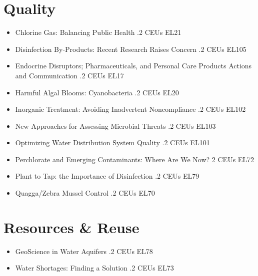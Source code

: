 \documentclass[10pt]{article}
\begin{document}
\section{Quality}
\begin{itemize}
  \item Chlorine Gas: Balancing Public Health .2 CEUs EL21

  \item Disinfection By-Products: Recent Research Raises Concern .2 CEUs EL105

  \item Endocrine Disruptors; Pharmaceuticals, and Personal Care Products Actions and Communication $.2$ CEUs EL17

  \item Harmful Algal Blooms: Cyanobacteria .2 CEUs EL20

  \item Inorganic Treatment: Avoiding Inadvertent Noncompliance .2 CEUs EL102

  \item New Approaches for Assessing Microbial Threats .2 CEUs EL103

  \item Optimizing Water Distribution System Quality .2 CEUs EL101

  \item Perchlorate and Emerging Contaminants: Where Are We Now? 2 CEUs EL72

  \item Plant to Tap: the Importance of Disinfection .2 CEUs EL79

  \item Quagga/Zebra Mussel Control .2 CEUs EL70

\end{itemize}

\section{Resources \& Reuse}
\begin{itemize}
  \item GeoScience in Water Aquifers .2 CEUs EL78

  \item Water Shortages: Finding a Solution .2 CEUs EL73

\end{itemize}
\end{document}
